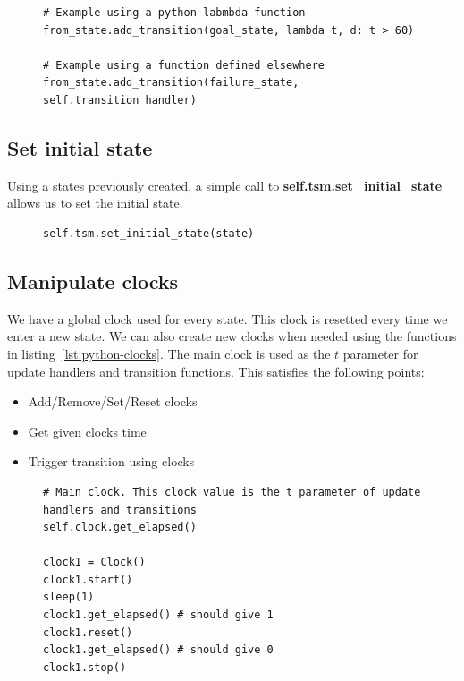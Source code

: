 \documentclass[12pt]{article}
\theoremstyle{definition}
\theoremstyle{definition}
\theoremstyle{remark}
\begin{document}
\begin{figure}[H]
    \begin{lstlisting}[caption="Add transition to any state",label={lst:python-add-transition}]
# Example using a python labmbda function
from_state.add_transition(goal_state, lambda t, d: t > 60)

# Example using a function defined elsewhere
from_state.add_transition(failure_state, self.transition_handler)
    \end{lstlisting}
\end{figure}


\subsection{Set initial state}

Using a states previously created, a simple call to \textbf{self.tsm.set\_initial\_state} allows us to set the initial state.

\begin{figure}[H]
    \begin{lstlisting}[caption="Set the initial state",label={lst:python-set-initial-state}]
self.tsm.set_initial_state(state)
    \end{lstlisting}
\end{figure}


\subsection{Manipulate clocks}\label{ManipulateClocks}

We have a global clock used for every state. This clock is resetted every time we enter a new state. We can also create new clocks when needed using the functions in listing~\ref{lst:python-clocks}. The main clock is used as the $t$ parameter for update handlers and transition functions. This satisfies the following points:
\begin{itemize}
\item Add/Remove/Set/Reset clocks
\item Get given clocks time
\item Trigger transition using clocks
\end{itemize}


\begin{figure}[H]
    \begin{lstlisting}[caption="Set the initial state",label={lst:python-clocks}]
# Main clock. This clock value is the t parameter of update handlers and transitions
self.clock.get_elapsed()

clock1 = Clock()
clock1.start()
sleep(1)
clock1.get_elapsed() # should give 1
clock1.reset()
clock1.get_elapsed() # should give 0
clock1.stop()
    \end{lstlisting}
\end{figure}
\end{document}
